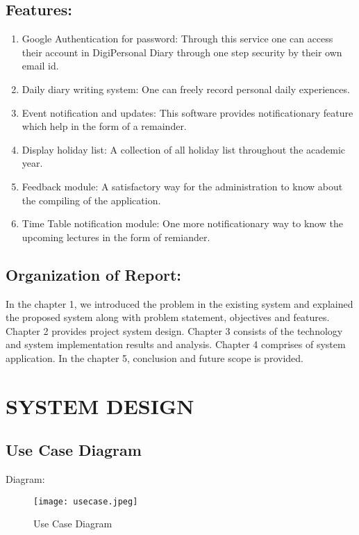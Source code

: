 \documentclass[12pt,a4paper]{report}
\begin{document}
\section{Features: }
\begin{enumerate}[label=\roman*.]
\item Google Authentication for password: Through this service one can access their account in DigiPersonal Diary through one step security by their own email id.
\item Daily diary writing system: One can freely record personal daily experiences.
\item Event notification and updates: This software provides notificationary feature which help in the form of a remainder.
\item Display holiday list: A collection of all holiday list throughout the academic year.
\item Feedback module: A satisfactory way for the administration to know about the compiling of the application.
\item Time Table notification module: One more notificationary way to know the upcoming lectures in the form of remiander.
\end{enumerate}

\section{Organization of Report: }
In the chapter 1, we introduced the problem in the existing system and explained the proposed system along with problem statement, objectives and features. Chapter 2 provides project system design. Chapter 3 consists of the technology and system implementation results and analysis. Chapter 4 comprises of system application. In the chapter 5, conclusion and future scope is provided.




\chapterfont{}
\setcounter{secnumdepth}{4}
\chapter {SYSTEM DESIGN}
\section{Use Case Diagram}
Diagram:
\begin{figure}[h]
    \centering
    \texttt{[image: usecase.jpeg]}
    \caption{Use Case Diagram}
    \label{fig:my_label}
\end{figure}
    
\end{document}
